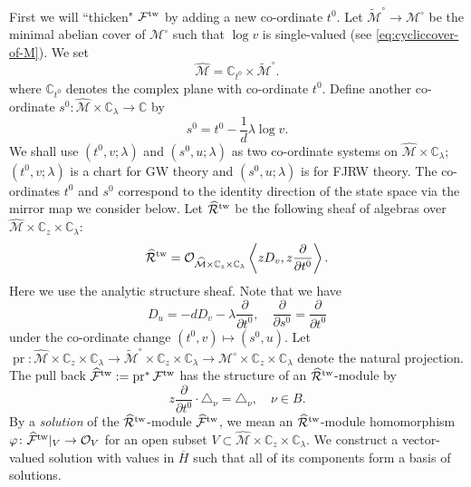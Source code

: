 \documentclass[11pt]{amsart}
\theoremstyle{definition} %
\theoremstyle{remark} %
\newcommand{\CC}{\mathbb C}
\newcommand{\tw}{{\rm tw}}
\def\parfrac#1#2{\frac{\partial #1}{\partial #2}}
\newcommand{\cO}{\mathcal{O}}
\newcommand{\cM}{\mathcal{M}}
\newcommand{\cMo}{\mathcal{M}^\circ}
\newcommand{\hcM}{\widehat{\cM}}
\newcommand{\tcMo}{\widetilde{\cM}^\circ}
\newcommand{\cF}{\mathcal{F}}
\newcommand{\hcF}{\widehat{\cF}}
\newcommand{\cR}{\mathcal{R}}
\newcommand{\hcR}{\widehat{\cR}}
\newcommand{\pr}{\operatorname{pr}}
\newcommand{\ov}{\overline}
\begin{document}
First we will ``thicken" $\cF^\tw$ by adding 
a new co-ordinate $t^0$. 
Let $\tcMo \to \cMo$ be the minimal abelian cover of 
$\cMo$ such that $\log v$ is single-valued 
(see \eqref{eq:cycliccover-of-M}). 
We set 
\[
\hcM = \CC_{t^0}\times \tcMo. 
\]
where $\CC_{t^0}$ denotes the complex plane with co-ordinate $t^0$. 
Define another co-ordinate 
$s^0\colon \hcM \times \CC_\lambda \to \CC$ by 
\[
s^0 = t^0 - \frac{1}{d}\lambda \log v. 
\]
We shall use $(t^0,v;\lambda)$ and $(s^0,u;\lambda)$ 
as two co-ordinate systems on $\hcM\times \CC_\lambda$; 
$(t^0,v;\lambda)$ is a chart for GW 
theory and $(s^0,u;\lambda)$ is for FJRW theory. 
The co-ordinates $t^0$ and $s^0$ correspond to 
the identity direction of the state space via the mirror map 
we consider below. 
Let $\hcR^\tw$ be the following sheaf of 
algebras over $\hcM\times \CC_z\times \CC_\lambda$: 
\[
\hcR^\tw = 
\cO_{\hcM\times \CC_z \times \CC_\lambda}
\left\langle z D_v, z \parfrac{}{t^0}\right \rangle.  
\]
Here we use the analytic structure sheaf. 
Note that we have 
\begin{equation} 
\label{eq:coordchange-vec}
D_u = -d D_v -\lambda \parfrac{}{t^0}, 
\quad 
\parfrac{}{s^0} = \parfrac{}{t^0}
\end{equation} 
under the co-ordinate change $(t^0,v) \mapsto (s^0,u)$. 
Let $\pr \colon \hcM\times \CC_z \times \CC_\lambda 
\to \tcMo \times \CC_z \times \CC_\lambda 
\to \cMo \times \CC_z \times \CC_\lambda$ 
denote the natural projection. 
The pull back $\hcF^\tw:= \pr^* \cF^\tw$ has the 
structure of an $\hcR^\tw$-module by 
\begin{equation*} 
z \parfrac{}{t^0} \cdot \triangle_{\nu} = \triangle_{\nu}, 
\quad \nu \in B. 
\end{equation*}  
By a \emph{solution} of the $\hcR^\tw$-module 
$\hcF^\tw$,  
we mean an $\hcR^\tw$-module homomorphism 
$\varphi \colon \hcF^\tw|_V \to \cO_{V}$ for an open 
subset $V\subset \hcM \times \CC_z\times \CC_\lambda$. 
We construct a vector-valued solution with values in $\ov{H}$ 
such that all of its components form a basis of solutions. 
\end{document}
